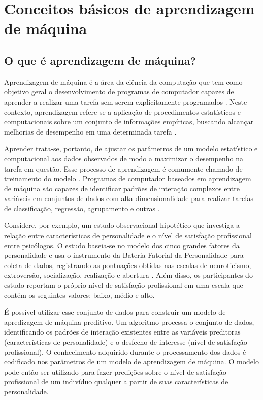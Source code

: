 \section{Conceitos básicos de aprendizagem de máquina}

\subsection{O que é aprendizagem de máquina?}

Aprendizagem de máquina é a área da ciência da computação que tem como objetivo geral o desenvolvimento de programas
de computador capazes de aprender a realizar uma tarefa sem serem explicitamente programados \cite{Bi2019, Theobald2021}.
Neste contexto, aprendizagem refere-se a aplicação de procedimentos estatísticos e computacionais sobre um conjunto
de informações empíricas, buscando alcançar melhorias de desempenho em uma determinada tarefa \cite{Theobald2021}.

Aprender trata-se, portanto, de ajustar os parâmetros de um modelo estatístico e computacional aos dados observados
de modo a maximizar o desempenho na tarefa em questão. Esse processo de aprendizagem é comumente chamado de treinamento
do modelo \cite{Bi2019}. Programas de computador baseados em aprendizagem de máquina são capazes de identificar padrões
de interação complexos entre variáveis em conjuntos de dados com alta dimensionalidade para realizar tarefas de classificação,
regressão, agrupamento e outras \cite{Theobald2021}.

Considere, por exemplo, um estudo observacional hipotético que investiga a relação entre características de personalidade
e o nível de satisfação profissional entre psicólogos. O estudo baseia-se no modelo dos cinco grandes fatores da personalidade
\cite{Hutz2018} e usa o instrumento da Bateria Fatorial da Personalidade para coleta de dados, registrando as pontuações obtidas
nas escalas de neuroticismo, extroversão, socialização, realização e abertura \cite{Sancineto2015}. Além disso, os participantes
do estudo reportam o próprio nível de satisfação profissional em uma escala que contém os seguintes valores: baixo, médio e alto.

É possível utilizar esse conjunto de dados para construir um modelo de apredizagem de máquina preditivo. Um algoritmo processa o conjunto de dados,
identificando os padrões de interação existentes entre as variáveis preditoras (características de personalidade) e o desfecho de interesse (nível
de satisfação profissional). O conhecimento adquirido durante o processamento dos dados é codificado nos parâmetros de um modelo de aprendizagem de
máquina. O modelo pode então ser utilizado para fazer predições sobre o nível de satisfação profissional de um indivíduo qualquer a partir de suas
características de personalidade.

